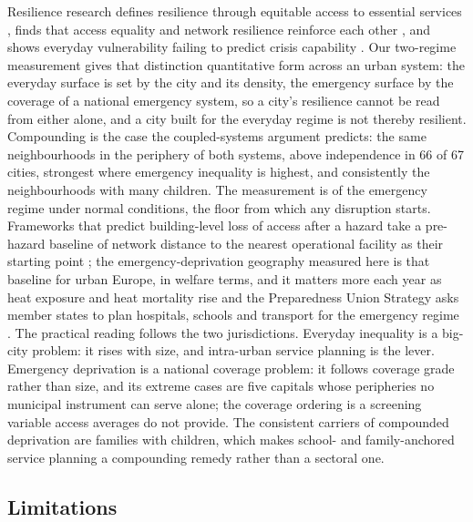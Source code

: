 \documentclass[9pt,twocolumn]{article}
\begin{document}
Resilience research defines resilience through equitable access to
essential services \citep{logan2020reframing,meerow2016defining}, finds
that access equality and network resilience reinforce each other
\citep{fan2022equality}, and shows everyday vulnerability failing to
predict crisis capability \citep{sirenko2026heatwaves}. Our two-regime
measurement gives that distinction quantitative form across an urban
system: the everyday surface is set by the city and its density, the
emergency surface by the coverage of a national emergency system, so a
city's resilience cannot be read from either alone, and a city built for
the everyday regime is not thereby resilient. Compounding is the case the
coupled-systems argument predicts: the same neighbourhoods in the
periphery of both systems, above independence in 66 of 67 cities,
strongest where emergency inequality is highest, and consistently the
neighbourhoods with many children. The measurement is of the emergency
regime under normal conditions, the floor from which any disruption
starts. Frameworks that predict building-level loss of access after a
hazard take a pre-hazard baseline of network distance to the nearest
operational facility as their starting point \citep{pagancajigas2026acces};
the emergency-deprivation geography measured here is that baseline for
urban Europe, in welfare terms, and it matters more each year as heat
exposure and heat mortality rise \citep{naumann2020heat,garcialeon2024mortality}
and the Preparedness Union Strategy asks member states to plan hospitals,
schools and transport for the emergency regime \citep{ec2025preparedness}.
The practical reading follows the two jurisdictions. Everyday inequality
is a big-city problem: it rises with size, and intra-urban service
planning is the lever. Emergency deprivation is a national coverage
problem: it follows coverage grade rather than size, and its extreme
cases are five capitals whose peripheries no municipal instrument can
serve alone; the coverage ordering is a screening variable access
averages do not provide. The consistent carriers of compounded
deprivation are families with children, which makes school- and
family-anchored service planning a compounding remedy rather than a
sectoral one.

\subsection*{Limitations}
\end{document}
